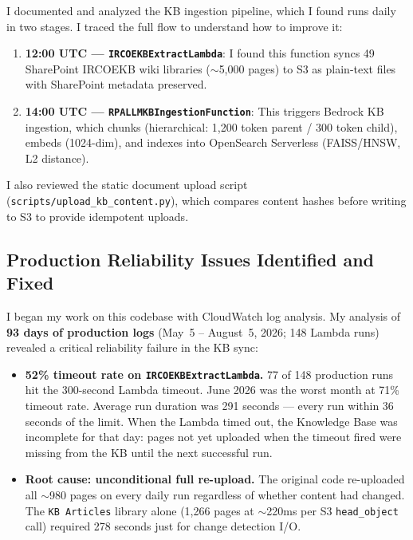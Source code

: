I documented and analyzed the KB ingestion pipeline, which I found runs daily in two stages.
I traced the full flow to understand how to improve it:

\begin{enumerate}
    \item \textbf{12:00 UTC --- \texttt{IRCOEKBExtractLambda}}: I found this function syncs
          49 SharePoint IRCOEKB wiki libraries ($\sim$5,000 pages) to S3
          as plain-text files with SharePoint metadata preserved.
    \item \textbf{14:00 UTC --- \texttt{RPALLMKBIngestionFunction}}: This triggers
          Bedrock KB ingestion, which chunks (hierarchical: 1,200 token
          parent / 300 token child), embeds (1024-dim), and indexes into
          OpenSearch Serverless (FAISS/HNSW, L2 distance).
\end{enumerate}

I also reviewed the static document upload script (\texttt{scripts/upload\_kb\_content.py}),
which compares content hashes before writing to S3 to provide idempotent uploads.

\subsection{Production Reliability Issues Identified and Fixed}

I began my work on this codebase with CloudWatch log analysis. My analysis of
\textbf{93 days of production logs} (May~5 -- August~5, 2026; 148 Lambda
runs) revealed a critical reliability failure in the KB sync:

\begin{itemize}
    \item \textbf{52\% timeout rate on \texttt{IRCOEKBExtractLambda}.}
          77 of 148 production runs hit the 300-second Lambda timeout.
          June 2026 was the worst month at 71\% timeout rate. Average
          run duration was 291 seconds --- every run within 36 seconds of
          the limit. When the Lambda timed out, the Knowledge Base was
          incomplete for that day: pages not yet uploaded when the timeout
          fired were missing from the KB until the next successful run.

    \item \textbf{Root cause: unconditional full re-upload.}
          The original code re-uploaded all $\sim$980 pages on every daily
          run regardless of whether content had changed. The
          \texttt{KB Articles} library alone (1,266 pages at $\sim$220ms
          per S3 \texttt{head\_object} call) required 278 seconds just
          for change detection I/O.
\end{itemize}

